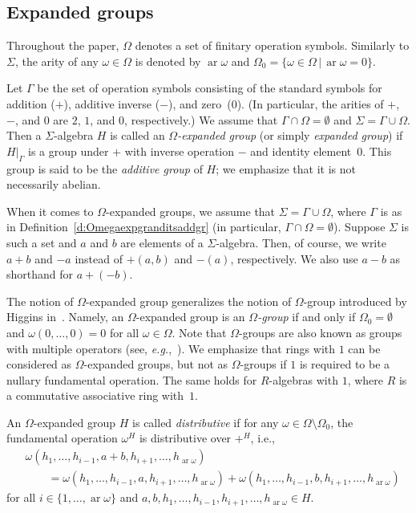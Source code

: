 \documentclass{jgcc}
\DeclareMathOperator{\ar}{ar}
\newcommand{\st}{\,|\,}
\newcommand{\Add}[1]{#1|_\Gamma}
\newcommand{\eg}{\emph{e.g.}}
\begin{document}
\subsection{Expanded groups}
\label{ss:expgroups}

Throughout the paper, $\Omega$ denotes a set of finitary
operation symbols. Similarly to $\Sigma$, the arity of any
$\omega\in\Omega$ is denoted by $\ar\omega$ and
$\Omega_0=\{\omega\in\Omega\st\ar\omega=0\}$.

\begin{defi}
\label{d:Omegaexpgranditsaddgr}
Let $\Gamma$ be the set of operation symbols consisting of
the standard symbols for addition ($+$), additive inverse
($-$), and zero~($0$). (In particular, the arities of $+$,
$-$, and $0$ are $2$, $1$, and $0$, respectively.) We assume
that $\Gamma\cap\Omega=\emptyset$ and
$\Sigma=\Gamma\cup\Omega$. Then a $\Sigma$-algebra $H$ is
called an \emph{$\Omega$-expanded group} (or simply
\emph{expanded group}) if $\Add H$ is a group under $+$ with
inverse operation $-$ and identity element~$0$. This group
is said to be the \emph{additive group} of $H$; we emphasize
that it is not necessarily abelian.
\end{defi}

When it comes to $\Omega$-expanded groups, we assume that
$\Sigma=\Gamma\cup\Omega$, where $\Gamma$ is as in
Definition~\ref{d:Omegaexpgranditsaddgr} (in particular,
$\Gamma\cap\Omega=\emptyset$). Suppose $\Sigma$ is such a
set and $a$ and $b$ are elements of a $\Sigma$-algebra.
Then, of course, we write $a+b$ and $-a$ instead of $+(a,b)$
and $-(a)$, respectively. We also use $a-b$ as shorthand for
$a+(-b)$.

The notion of $\Omega$-expanded group generalizes the notion
of $\Omega$-group introduced by Higgins
in~\cite[Section~2]{Hig56}. Namely, an $\Omega$-expanded
group is an \emph{$\Omega$-group} if and only if
$\Omega_0=\emptyset$ and $\omega(0,\dots,0)=0$ for all
$\omega\in\Omega$. Note that $\Omega$-groups are also known
as groups with multiple operators (see,
\eg,~\cite[Chapter~II, Section~2]{Cohn81}). We emphasize
that rings with $1$ can be considered as $\Omega$-expanded
groups, but not as $\Omega$-groups if $1$ is required to be
a nullary fundamental operation. The same holds for
$R$-algebras with $1$, where $R$ is a commutative
associative ring with~$1$.

\begin{defi}
\label{d:disOmegaexpgr}
An $\Omega$-expanded group $H$ is called \emph{distributive}
if for any $\omega\in\Omega\setminus\Omega_0$, the
fundamental operation $\omega^H$ is distributive over $+^H$,
i.e.,
\begin{align*}
&\omega(h_1,\dots,h_{i-1},a+b,h_{i+1},\dots,h_{\ar\omega})
\\&\qquad
=\omega(h_1,\dots,h_{i-1},a,h_{i+1},\dots,h_{\ar\omega})
+\omega(h_1,\dots,h_{i-1},b,h_{i+1},\dots,h_{\ar\omega})
\end{align*}
for all $i\in\{1,\dots,\ar\omega\}$ and
$a,b,h_1,\dots,h_{i-1},h_{i+1},\dots,h_{\ar\omega}\in H$.
\end{defi}
\end{document}
